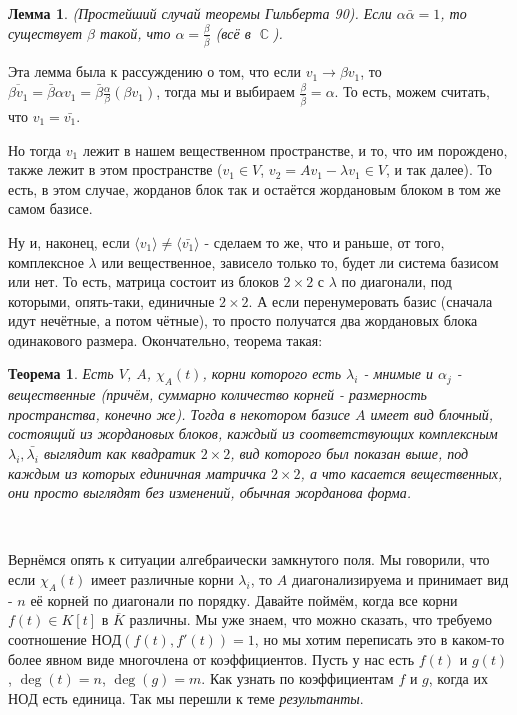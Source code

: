 \documentclass[a4paper,100pt]{article}
\theoremstyle{indented}
\newtheorem{theorem}{Теорема}
\newtheorem{lemma}{Лемма}
\theoremstyle{definition}
\theoremstyle{remark}
\DeclareMathOperator{\CC}{\mathbb{C}}
\begin{document}
\begin{lemma}
    (Простейший случай теоремы Гильберта 90). Если $\alpha \bar{\alpha}=1$, то существует $\beta$ такой, что $\alpha=\frac{\beta}{\bar{\beta}}$ (всё в $\CC$). 
\end{lemma}

Эта лемма была к рассуждению о том, что если $v_1\rightarrow \beta v_1$, то $\overline{\beta v_1}=\bar{\beta}\alpha v_1 = \bar{\beta}\frac{\alpha}{\beta}(\beta v_1)$, тогда мы и выбираем $\frac{\beta}{\bar{\beta}}=\alpha$. То есть, можем считать, что $v_1=\bar{v_1}$. \ 

Но тогда $v_1$ лежит в нашем вещественном пространстве, и то, что им порождено, также лежит в этом пространстве ($v_1\in V$, $v_2=Av_1-\lambda v_1\in V$, и так далее). То есть, в этом случае, жорданов блок так и остаётся жордановым блоком в том же самом базисе. \ 

Ну и, наконец, если $\langle v_1\rangle\neq\langle \bar{v_1}\rangle$ - сделаем то же, что и раньше, от того, комплексное $\lambda$ или вещественное, зависело только то, будет ли система базисом или нет. То есть, матрица состоит из блоков $2\times 2$ с $\lambda$ по диагонали, под которыми, опять-таки, единичные $2\times 2$. А если перенумеровать базис (сначала идут нечётные, а потом чётные), то просто получатся два жордановых блока одинакового размера. Окончательно, теорема такая: \\ 

\begin{theorem}
    Есть $V$, $A$, $\chi_A(t)$, корни которого есть $\lambda_i$ - мнимые и $\alpha_j$ - вещественные (причём, суммарно количество корней - размерность пространства, конечно же). Тогда в некотором базисе $A$ имеет вид блочный, состоящий из жордановых блоков, каждый из соответствующих комплексным $\lambda_i, \bar{\lambda_i}$ выглядит как квадратик $2\times 2$, вид которого был показан выше, под каждым из которых единичная матричка $2\times 2$, а что касается вещественных, они просто выглядят без изменений, обычная жорданова форма. 
\end{theorem}\

Вернёмся опять к ситуации алгебраически замкнутого поля. Мы говорили, что если $\chi_A(t)$ имеет различные корни $\lambda_i$, то $A$ диагонализируема и принимает вид - $n$ её корней по диагонали по порядку. Давайте поймём, когда все корни $f(t)\in K[t]$ в $\overline{K}$ различны. Мы уже знаем, что можно сказать, что требуемо соотношение $НОД(f(t), f'(t))=1$, но мы хотим переписать это в каком-то более явном виде многочлена от коэффициентов. Пусть у нас есть $f(t)$ и $g(t)$, $\deg(t)=n$, $\deg(g)=m$. Как узнать по коэффициентам $f$ и $g$, когда их $НОД$ есть единица. Так мы перешли к теме \textit{результанты}. \ 
\end{document}
